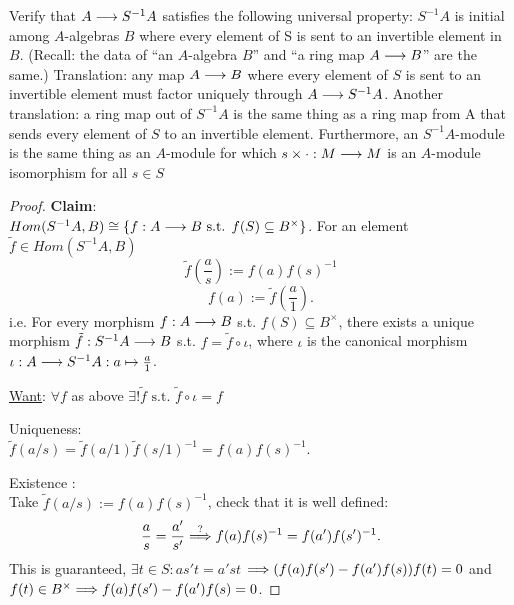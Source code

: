 \documentclass[11pt]{book} %
\begin{document}
\begin{exr}
Verify that $A\longrightarrow S^{-1}A$ satisfies the following universal property: $S^{-1}A$ is initial among $A$-algebras $B$ where every element of S is sent to an invertible element in $B$. (Recall: the data of “an $A$-algebra $B$” and “a ring map $A \longrightarrow B$” are the same.) Translation: any map $A \longrightarrow B $ where every element of $S$ is sent to an invertible element must factor uniquely through $A\longrightarrow S^{-1}A$. Another translation: a ring map out of $S^{-1}A$ is the same thing as a ring map from A that sends every element of $S$ to an invertible element. Furthermore, an $S^{-1}A$-module is the same thing as an $A$-module for which $s\times\cdot : M\longrightarrow M$ is an $A$-module isomorphism for all $s \in S$
\end{exr}
\begin{proof}
\textbf{Claim}:\\
$Hom(S^{-1}{A},{B})\cong \{f:{A}\longrightarrow {B}\text{ s.t. } f(S)\subseteq {B}^{\times}\}$. 
For an element $\tilde{f}\in Hom(S^{-1}{A},{B})$
$$
\tilde{f}\left(\frac{a}{s}\right):=f(a)f(s)^{-1}
$$
$$
f(a):=\tilde{f}\left(\frac{a}{1}\right).
$$
i.e. For every morphism $f:{A}\longrightarrow{B}$ s.t. $f(S)\subseteq {B}^{\times}$, there exists a unique morphism $\tilde{f}:S^{-1}{A}\longrightarrow {B}$ s.t. $f=\tilde{f}\circ\iota$, where $\iota $ is the canonical morphism $\iota:{A}\longrightarrow S^{-1}{A}:a\mapsto \frac{a}{1}$.
\begin{center}
\end{center}

\underline{Want}: $\forall f$ as above $\exists ! \tilde{f}\text{ s.t. } \tilde{f}\circ\iota=f$

Uniqueness:\\
$\tilde{f}(a/s)=\tilde{f}(a/1)\tilde{f}(s/1)^{-1}=f(a)f(s)^{-1}$.

Existence :\\
Take $\tilde{f}(a/s):=f(a)f(s)^{-1}$, check that it is well defined:
$$
\frac{a}{s}=\frac{a'}{s'}\overset{?}{\Longrightarrow} f(a)f(s)^{-1}=f(a')f(s')^{-1}.
$$
This is guaranteed, $\exists t\in S: as' t=a's t$ $\Longrightarrow (f(a)f(s')-f(a')f(s))f(t)=0$ and $f(t)\in {B}^{\times}\Longrightarrow f(a)f(s')-f(a')f(s)=0$.
\end{proof}
\end{document}

